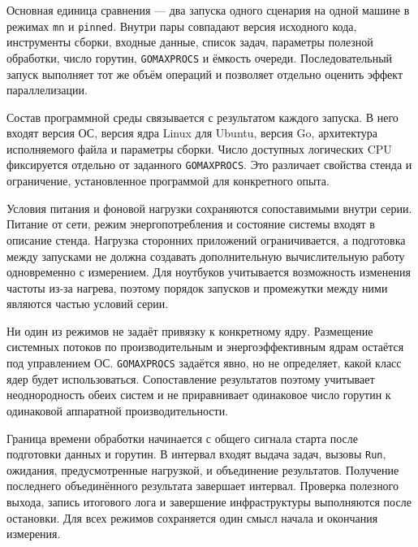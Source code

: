 Основная единица сравнения — два запуска одного сценария на одной машине в режимах
  \texttt{mn} и \texttt{pinned}. Внутри пары совпадают версия исходного кода, инструменты сборки,
  входные данные, список задач, параметры полезной обработки, число горутин, \texttt{GOMAXPROCS}
  и ёмкость очереди. Последовательный запуск выполняет тот же объём операций и позволяет
  отдельно оценить эффект параллелизации.

Состав программной среды связывается с результатом каждого запуска. В него входят версия ОС,
  версия ядра Linux для Ubuntu, версия Go, архитектура исполняемого файла и параметры сборки.
  Число доступных логических CPU фиксируется отдельно от заданного \texttt{GOMAXPROCS}.
  Это различает свойства стенда и ограничение, установленное программой для конкретного опыта.


Условия питания и фоновой нагрузки сохраняются сопоставимыми внутри серии. Питание от сети,
  режим энергопотребления и состояние системы входят в описание стенда. Нагрузка сторонних
  приложений ограничивается, а подготовка между запусками не должна создавать дополнительную
  вычислительную работу одновременно с измерением. Для ноутбуков учитывается возможность
  изменения частоты из-за нагрева, поэтому порядок запусков и промежутки между ними являются
  частью условий серии.


Ни один из режимов не задаёт привязку к конкретному ядру. Размещение системных потоков
  по производительным и энергоэффективным ядрам остаётся под управлением ОС.
  \texttt{GOMAXPROCS} задаётся явно, но не определяет, какой класс ядер будет использоваться.
  Сопоставление результатов поэтому учитывает неоднородность обеих систем и не приравнивает
  одинаковое число горутин к одинаковой аппаратной производительности.

Граница времени обработки начинается с общего сигнала старта после подготовки данных и горутин.
  В интервал входят выдача задач, вызовы \texttt{Run}, ожидания, предусмотренные нагрузкой,
  и объединение результатов. Получение последнего объединённого результата завершает интервал.
  Проверка полезного выхода, запись итогового лога и завершение инфраструктуры выполняются
  после остановки. Для всех режимов сохраняется один смысл начала и окончания измерения.

